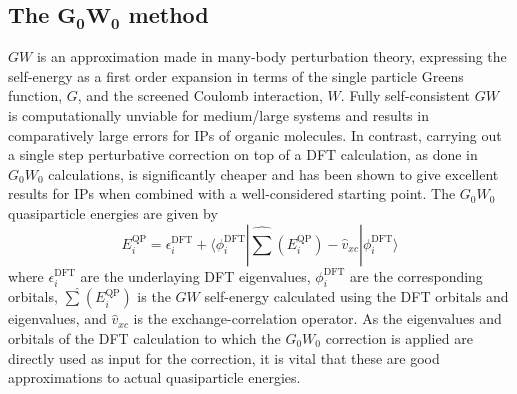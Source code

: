 \documentclass[journal=jctcce,manuscript=article,layout=twocolumn]{achemso}
\begin{document}
\subsection*{The $\boldsymbol{G_0W_0}$ method}
$GW$ is an approximation made in many-body perturbation theory, expressing the self-energy as a first order expansion in terms of the single particle Greens function, $G$, and the screened Coulomb interaction, $W$.\cite{GW,GW_2,GW_3} 
Fully self-consistent $GW$ is computationally unviable for medium/large systems and results in comparatively large errors for IPs of organic molecules.\cite{jctc_2016_IP_III_GW_stuff, phys_rev_b_2012_gw_hierachy_results, GW100_scGW} 
In contrast, carrying out a single step perturbative correction on top of a DFT calculation, as done in $G_0W_0$ calculations, is significantly cheaper and has been shown to give excellent results for IPs when combined with a well-considered 
starting point.\cite{phys_rev_b_2010_gw_sc_on_dft,phys_rev_b_2012_gw_hierachy_results,jctc_2016_IP_II_lrc_funct_GW, jctc_2016_IP_III_GW_stuff, GW100, GW100_scGW, gallandi_koerzd_lrc_g0w0_2015, GW_acenes, PhysRevB.86.041110, phys_rev_b_2016_dsle_tuning, phys_rev_b_2013_g0w0_tuning,phys_rev_b_2015_g0w0_tuning_polyacetylene}  
The $G_0W_0$ quasiparticle energies are given by
\begin{equation} \label{eq:g0w0}
E_i^{\mathrm{QP}}={\epsilon}_{i}^{\mathrm{DFT}} + \langle\phi_i^{\mathrm{DFT}}| \hat{\sum}(E_i^{\mathrm{QP}})-\hat{v}_{xc}|\phi_i^{\mathrm{DFT}}\rangle
\end{equation}
where ${\epsilon}_{i}^{\mathrm{DFT}}$ are the underlaying DFT eigenvalues, $\phi_i^{\mathrm{DFT}}$ are the corresponding orbitals, $\hat{\sum}(E_i^{\mathrm{QP}})$ is the $GW$ self-energy calculated using the DFT
orbitals and eigenvalues, and $\hat{v}_{xc}$ is the exchange-correlation operator.\cite{notevxc}
As the eigenvalues and orbitals of the DFT calculation to which the $G_0W_0$ correction is applied are directly used
as input for the correction, it is vital that these are good approximations to actual quasiparticle energies.
\end{document}
